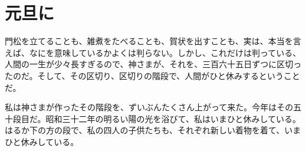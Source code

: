 \section{元旦に}
門松を立てることも、雑煮をたべることも、賀状を出すことも、実は、本当を言えば、なにを意味しているかよくは判らない。しかし、これだけは判っている、人間の一生が少々長すぎるので、神さまが、それを、三百六十五日ずつに区切ったのだ。そして、その区切り、区切りの階段で、人間がひと休みするということだ。

私は神さまが作ったその階段を、ずいぶんたくさん上がって来た。今年はその五十段目だ。昭和三十二年の明るい陽の光を浴びて、私はいまひと休みしている。はるか下の方の段で、私の四人の子供たちも、それぞれ新しい着物を着て、いまひと休みしている。